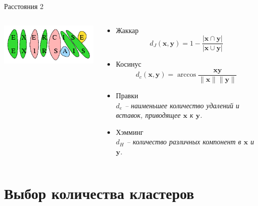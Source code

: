 \documentclass[aspectratio=169]{beamer}
\begin{document}
\begin{frame}{Расстояния 2}

\begin{columns}[T]

    \begin{column}{.4\textwidth}
    \vspace{5em}
	\begin{center}
   		\includegraphics[scale=0.5]{images/edit.png}
    \end{center}
    \end{column}
       
    \begin{column}{.6\textwidth}
    \begin{itemize}
		\item Жаккар
		\[
		d_J(\mathbf{x}, \mathbf{y}) = 1 - \frac{|\mathbf{x} \cap \mathbf{y}|}{|\mathbf{x} \cup \mathbf{y}|}
		\]
		\item Косинус
		\[
		d_c(\mathbf{x}, \mathbf{y}) = \arccos \frac{\mathbf{x} \mathbf{y}}{\|\mathbf{x}\| \|\mathbf{y}\|}
		\]
		\item Правки \\
		{\it $d_e$ -- наименьшее количество удалений и вставок, приводящее $\mathbf{x}$ к $\mathbf{y}$.}
		\item Хэмминг \\
		{\it $d_H$ -- количество различных компонент в $\mathbf{x}$ и $\mathbf{y}$.}
	\end{itemize}
    
    \end{column}
  \end{columns}

\end{frame}


\section{Выбор количества кластеров}

\end{document}
